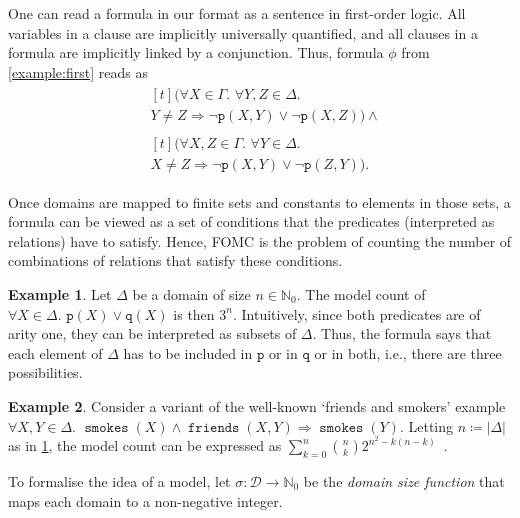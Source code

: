 \documentclass{article}
\theoremstyle{definition}
\newtheorem{example}{Example}
\theoremstyle{remark}
\DeclareMathOperator{\friends}{\texttt{friends}}
\DeclareMathOperator{\smokes}{\texttt{smokes}}
\begin{document}
One can read a formula in our format as a sentence in first-order logic. All
variables in a clause are implicitly universally quantified, and all clauses in
a formula are implicitly linked by a conjunction. Thus, formula $\phi$ from
\cref{example:first} reads as
\begin{align*}
  &\begin{multlined}[t]
    (\forall X \in \Gamma\text{. }\forall Y, Z \in \Delta\text{. }\\
    Y \ne Z \Rightarrow \neg \texttt{p}(X, Y) \lor \neg \texttt{p}(X, Z)) \land{}
    \end{multlined}\\
  &\begin{multlined}[t]
    (\forall X, Z \in \Gamma\text{. }\forall Y \in \Delta\text{. }\\
    X \ne Z \Rightarrow \neg \texttt{p}(X, Y) \lor \neg \texttt{p}(Z, Y)).
    \end{multlined}
\end{align*}

Once domains are mapped to finite sets and constants to elements in those sets,
a formula can be viewed as a set of conditions that the predicates (interpreted
as relations) have to satisfy. Hence, FOMC is the problem of counting the number
of combinations of relations that satisfy these conditions.

\begin{example}\label{example:simple}
  Let $\Delta$ be a domain of size $n \in \mathbb{N}_{0}$. The model count of
  $\forall X \in \Delta\text{. } \texttt{p}(X) \lor \texttt{q}(X)$ is then
  $3^{n}$. Intuitively, since both predicates are of arity one, they can be
  interpreted as subsets of $\Delta$. Thus, the formula says that each element
  of $\Delta$ has to be included in $\texttt{p}$ or in $\texttt{q}$ or in both,
  i.e., there are three possibilities.
\end{example}

\begin{example}\label{example:smokers}
  Consider a variant of the well-known `friends and smokers' example
  $\forall X, Y \in \Delta\text{.
  } \smokes(X) \land \friends(X, Y) \Rightarrow \smokes(Y)$. Letting
  $n \coloneqq |\Delta|$ as in \cref{example:simple}, the model count can be
  expressed as
  $\sum_{k=0}^{n} \binom{n}{k}2^{n^{2} - k(n-k)}$~\cite{DBLP:conf/kr/BroeckMD14}.
\end{example}

To formalise the idea of a model, let
$\sigma\colon \mathcal{D} \to \mathbb{N}_{0}$ be the \emph{domain size function}
that maps each domain to a non-negative integer.
\end{document}
